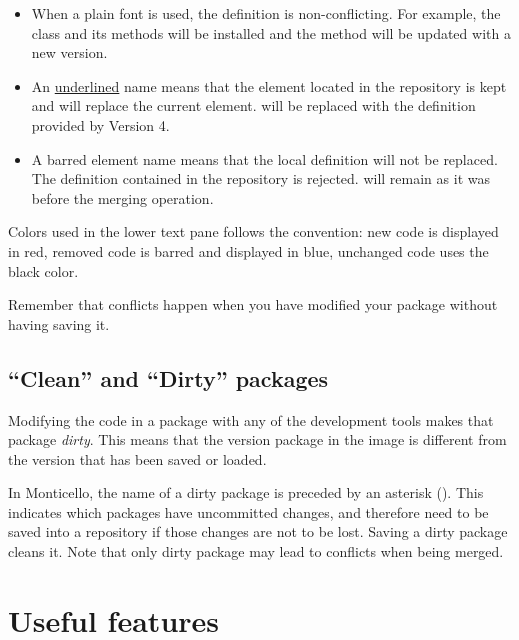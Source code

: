 \documentclass[a4paper,10pt,twoside]{book}
\begin{document}
\begin{itemize}
\item When a plain font is used, the definition is non-conflicting. For example, the class  and its methods will be installed and the method  will be updated with a new version.
\item An \underline{underlined} name means that the element located in the repository is kept and will replace the current element.  will be replaced with the definition provided by Version 4.
\item A barred element name means that the local definition will not be replaced. The definition contained in the repository is rejected.  will remain as it was before the merging operation.
\end{itemize}

Colors used in the lower text pane follows the convention: new code is displayed in red, removed code is barred and displayed in blue, unchanged code uses the black color. 

Remember that conflicts happen when you have modified your package without having saving it.




\subsection{``Clean'' and ``Dirty'' packages}

Modifying the code in a package with any of the development tools makes that package \emph{dirty}.
This means that the version package in the image is different from the version that has been saved or loaded. 

In Monticello, the name of a dirty package is preceded by an asterisk (\ct{*}). This indicates which packages have uncommitted changes, and therefore need to be saved into a repository if those changes are not to be lost. Saving a dirty package cleans it. Note that only dirty package may lead to conflicts when being merged.

\section{Useful features}
\end{document}
